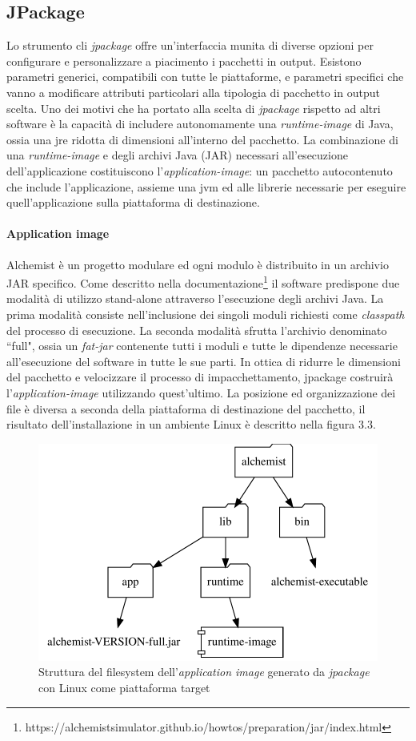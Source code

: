 \subsection{JPackage} Lo strumento \ac{cli} \textit{jpackage} offre un'interfaccia munita di diverse opzioni per configurare e personalizzare a piacimento i pacchetti in output. Esistono parametri generici, compatibili con tutte le piattaforme, e parametri specifici che vanno a modificare attributi particolari alla tipologia di pacchetto in output scelta. Uno dei motivi che ha portato alla scelta di \textit{jpackage} rispetto ad altri software è la capacità di includere autonomamente una \textit{runtime-image} di Java, ossia una \ac{jre} ridotta di dimensioni all'interno del pacchetto. La combinazione di una \textit{runtime-image} e degli archivi Java (JAR) necessari all'esecuzione dell'applicazione costituiscono l'\textit{application-image}: un pacchetto autocontenuto che include l'applicazione, assieme una \ac{jvm} ed alle librerie necessarie per eseguire quell'applicazione sulla piattaforma di destinazione.

\paragraph{Application image} Alchemist è un progetto modulare ed ogni modulo è distribuito in un archivio JAR specifico. Come descritto nella documentazione\footnote{https://alchemistsimulator.github.io/howtos/preparation/jar/index.html} il software predispone due modalità di utilizzo stand-alone attraverso l'esecuzione degli archivi Java. La prima modalità consiste nell'inclusione dei singoli moduli richiesti come \textit{classpath} del processo di esecuzione. La seconda modalità sfrutta l'archivio denominato ``full", ossia un \textit{fat-jar} contenente tutti i moduli e tutte le dipendenze necessarie all'esecuzione del software in tutte le sue parti. In ottica di ridurre le dimensioni del pacchetto e velocizzare il processo di impacchettamento, jpackage costruirà l'\textit{application-image} utilizzando quest'ultimo. La posizione ed organizzazione dei file è diversa a seconda della piattaforma di destinazione del pacchetto, il risultato dell'installazione in un ambiente Linux è descritto nella figura 3.3.  

\begin{figure}
	\centering
	\includegraphics[width=.7\linewidth]{figures/application-image-folder-structure.pdf}
	\caption{Struttura del filesystem dell'\textit{application image} generato da \textit{jpackage} con Linux come piattaforma target}
	\label{fig:application-image-folder-structure}
\end{figure}

